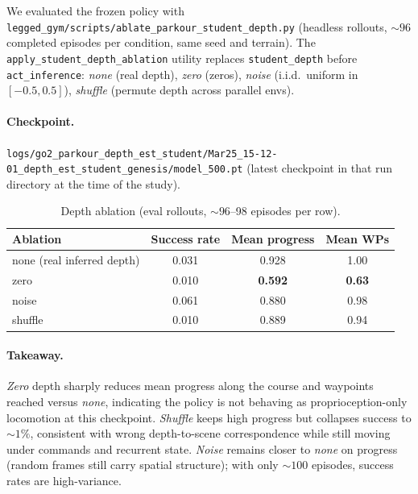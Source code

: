 \documentclass[11pt,a4paper]{article}
\begin{document}
We evaluated the frozen policy with \texttt{legged\_gym/scripts/ablate\_parkour\_student\_depth.py}
(headless rollouts, ${\sim}96$ completed episodes per condition, same seed and
terrain). The \texttt{apply\_student\_depth\_ablation} utility replaces
\texttt{student\_depth} before \texttt{act\_inference}: \emph{none} (real
depth), \emph{zero} (zeros), \emph{noise} (i.i.d.\ uniform in $[-0.5,0.5]$),
\emph{shuffle} (permute depth across parallel envs).

\paragraph{Checkpoint.}
\texttt{logs/go2\_parkour\_depth\_est\_student/Mar25\_15-12-01\_depth\_est\_student\_genesis/model\_500.pt}
(latest checkpoint in that run directory at the time of the study).

\begin{table}[ht]
\centering
\caption{Depth ablation (eval rollouts, ${\sim}96$--98 episodes per row).}
\label{tab:ablation}
\begin{tabular}{lccc}
\toprule
\textbf{Ablation} & \textbf{Success rate} & \textbf{Mean progress} & \textbf{Mean WPs} \\
\midrule
none (real inferred depth) & 0.031 & 0.928 & 1.00 \\
zero & 0.010 & \textbf{0.592} & \textbf{0.63} \\
noise & 0.061 & 0.880 & 0.98 \\
shuffle & 0.010 & 0.889 & 0.94 \\
\bottomrule
\end{tabular}
\end{table}

\paragraph{Takeaway.}
\emph{Zero} depth sharply reduces mean progress along the course and waypoints
reached versus \emph{none}, indicating the policy is not behaving as
proprioception-only locomotion at this checkpoint. \emph{Shuffle} keeps high
progress but collapses success to ${\sim}1\%$, consistent with wrong
depth-to-scene correspondence while still moving under commands and recurrent
state. \emph{Noise} remains closer to \emph{none} on progress (random frames still
carry spatial structure); with only ${\sim}100$ episodes, success rates are
high-variance.

\end{document}
